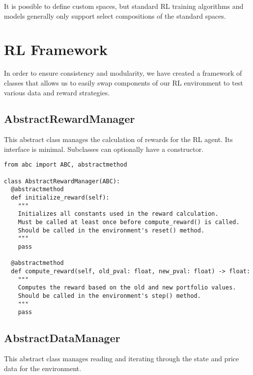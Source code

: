 It is possible to define custom spaces, but standard RL training algorithms and models
generally only support select compositions of the standard spaces.



\section{RL Framework}

In order to ensure consistency and modularity, we have created a framework of classes
that allows us to easily swap components of our RL environment to test various data
and reward strategies.

\subsection{AbstractRewardManager}

This abstract class manages the calculation of rewards for the RL agent.
Its interface is minimal. Subclasses can optionally have a constructor.

\begin{verbatim}
from abc import ABC, abstractmethod

class AbstractRewardManager(ABC):
  @abstractmethod
  def initialize_reward(self):
    """
    Initializes all constants used in the reward calculation.
    Must be called at least once before compute_reward() is called.
    Should be called in the environment's reset() method.
    """
    pass

  @abstractmethod
  def compute_reward(self, old_pval: float, new_pval: float) -> float:
    """
    Computes the reward based on the old and new portfolio values.
    Should be called in the environment's step() method.
    """
    pass
\end{verbatim}


\subsection{AbstractDataManager}

This abstract class manages reading and iterating through the state and price data for the environment.

